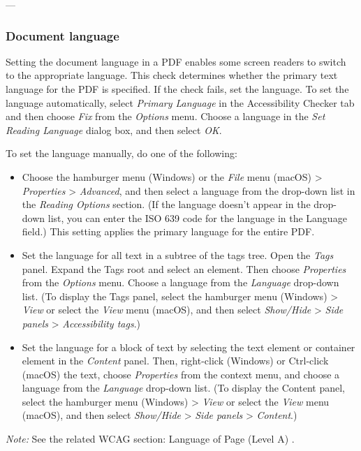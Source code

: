 ---

\subsubsection{Document language}
\label{subsubsec:acrobat-language}
Setting the document language in a PDF enables some screen readers to switch to the appropriate language. This check determines whether the primary text language for the PDF is specified. If the check fails, set the language\footnotemark[1].
To set the language automatically, select \emph{Primary Language} in the Accessibility Checker tab and then choose \emph{Fix} from the \emph{Options} menu. Choose a language in the \emph{Set Reading Language} dialog box, and then select \emph{OK}.

To set the language manually, do one of the following:
\begin{itemize}
    \item Choose the hamburger menu (Windows) or the \emph{File} menu (macOS) > \emph{Properties} > \emph{Advanced}, and then select a language from the drop-down list in the \emph{Reading Options} section. (If the language doesn't appear in the drop-down list, you can enter the ISO 639 code for the language in the Language field.) This setting applies the primary language for the entire PDF.
    \item Set the language for all text in a subtree of the tags tree. Open the \emph{Tags} panel. Expand the Tags root and select an element. Then choose \emph{Properties} from the \emph{Options} menu. Choose a language from the \emph{Language} drop-down list. (To display the Tags panel, select the hamburger menu (Windows) > \emph{View} or select the \emph{View} menu (macOS), and then select \emph{Show/Hide} > \emph{Side panels} > \emph{Accessibility tags}.)
    \item Set the language for a block of text by selecting the text element or container element in the \emph{Content} panel. Then, right-click (Windows) or Ctrl-click (macOS) the text, choose \emph{Properties} from the context menu, and choose a language from the \emph{Language} drop-down list. (To display the Content panel, select the hamburger menu (Windows) > \emph{View} or select the \emph{View} menu (macOS), and then select \emph{Show/Hide} > \emph{Side panels} > \emph{Content}.)
\end{itemize}

\vspace{0.5em}
\noindent\textit{Note:} See the related WCAG section: Language of Page (Level A) \cite{WCAG}.

